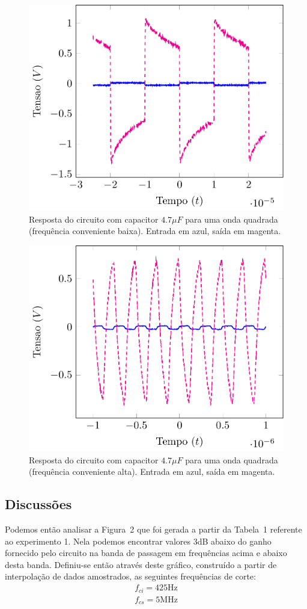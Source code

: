 \documentclass[12pt,a4paper]{article}
\begin{document}
\begin{figure}[htpb]
  \centering
  \includegraphics[width=0.8\linewidth]{img/BaixasFreq47u.pdf}
  \caption{Resposta do circuito com capacitor $4.7\mu F$ para uma onda quadrada (frequência conveniente baixa). Entrada em azul, saída em magenta.}
  \label{fig:6}
\end{figure}
\begin{figure}[htpb]
  \centering
  \includegraphics[width=0.8\linewidth]{img/AltasFreq47u.pdf}
  \caption{Resposta do circuito com capacitor $4.7\mu F$ para uma onda quadrada (frequência conveniente alta). Entrada em azul, saída em magenta.}
  \label{fig:7}
\end{figure}
\newpage

\subsection{Discussões}
Podemos então analisar a Figura~2 que foi gerada a partir da Tabela~1 referente ao experimento 1.
Nela podemos encontrar valores 3dB abaixo do ganho fornecido pelo circuito na banda de passagem 
em frequências acima e abaixo desta banda. Definiu-se então através deste gráfico, construído a partir de
interpolação de dados amostrados, as seguintes frequências de corte:
\begin{align}
  f_{ci} = 425 \text{Hz} \\
  f_{cs} = 5 \text{MHz}
\end{align}
\end{document}
